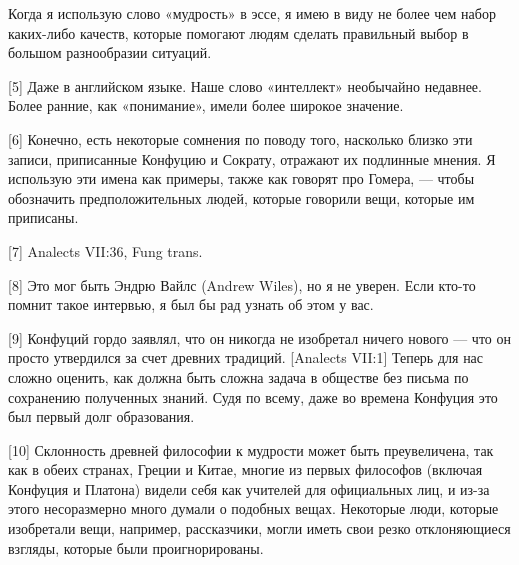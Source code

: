 \documentclass[ebook,12pt,oneside,openany]{memoir}
\begin{document}
Когда я использую слово «мудрость» в эссе, я имею в виду не более чем
набор каких-либо качеств, которые помогают людям сделать правильный
выбор в большом разнообразии ситуаций.

[5] Даже в английском языке. Наше слово «интеллект» необычайно
недавнее. Более ранние, как «понимание», имели более широкое значение.

[6] Конечно, есть некоторые сомнения по поводу того, насколько близко
эти записи, приписанные Конфуцию и Сократу, отражают их подлинные
мнения. Я использую эти имена как примеры, также как говорят про
Гомера, — чтобы обозначить предположительных людей, которые говорили
вещи, которые им приписаны.

[7] Analects VII:36, Fung trans.

[8] Это мог быть Эндрю Вайлс (Andrew Wiles), но я не уверен. Если
кто-то помнит такое интервью, я был бы рад узнать об этом у вас.

[9] Конфуций гордо заявлял, что он никогда не изобретал ничего нового
— что он просто утвердился за счет древних традиций. [Analects VII:1]
Теперь для нас сложно оценить, как должна быть сложна задача в
обществе без письма по сохранению полученных знаний. Судя по всему,
даже во времена Конфуция это был первый долг образования.

[10] Склонность древней философии к мудрости может быть преувеличена,
так как в обеих странах, Греции и Китае, многие из первых философов
(включая Конфуция и Платона) видели себя как учителей для официальных
лиц, и из-за этого несоразмерно много думали о подобных вещах.
Некоторые люди, которые изобретали вещи, например, рассказчики, могли
иметь свои резко отклоняющиеся взгляды, которые были проигнорированы.
\end{document}
